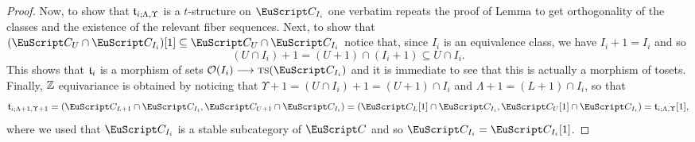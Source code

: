 {\begin{proof}
Now, to show that $\mathfrak{t}_{i;\Lambda,\Upsilon}$ is a $t$-structure on $\C_{I_i}$ one verbatim repeats the proof of Lemma  to get orthogonality of the classes and the existence of the relevant fiber sequences. Next, to show that $(\C_U\cap \C_{I_i})[1]\subseteq \C_U\cap \C_{I_i}$ notice that, since $I_i$ is an equivalence class, we have $I_i+1=I_i$ and so 
\[
(U\cap I_{i})+1=(U+1)\cap (I_i+1)\subseteq U\cap I_i.
\]
This shows that $\mathfrak{t}_i$ is a morphism of sets $\mathcal{O}(I_i)\to \ts(\C_{I_i})$ and it is immediate to see that this is actually a morphism of tosets. Finally, $\mathbb{Z}$ equivariance is obtained by noticing that $\Upsilon+1=(U\cap I_i)+1=(U+1)\cap I_i$ and $\Lambda+1=(L+1)\cap I_i$, so that
\[
\tee_{i;\Lambda+1,\Upsilon+1}=(\C_{L+1}\cap \C_{I_i},\C_{U+1}\cap \C_{I_i})=(\C_L[1]\cap \C_{I_i},\C_U[1]\cap \C_{I_i})=\tee_{i;\Lambda,\Upsilon}[1],
\]
where we used that $\C_{I_i}$ is a stable subcategory of $\C$ and so $\C_{I_i}=\C_{I_i}[1]$.
\end{proof}

}
